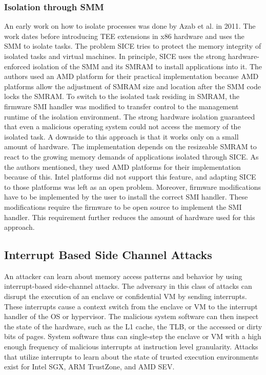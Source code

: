 \subsubsection{Isolation through SMM}
\label{sec:20:isolation_smm}
An early work on how to isolate processes was done by Azab et al. in 2011.\cite{azab_sice_2011}
The work dates before introducing TEE extensions in x86 hardware and uses the SMM to isolate tasks. The problem
SICE tries to protect the memory integrity of isolated tasks and virtual machines.
In principle, SICE uses the strong hardware-enforced
isolation of the SMM and its SMRAM to install applications into it. The authors used an AMD platform for
their practical implementation because AMD platforms allow the adjustment of SMRAM size and location after the SMM code
locks the SMRAM.\cite{bios2014amd} To switch
to the isolated task residing in SMRAM, the firmware SMI handler was modified to transfer control to the
management runtime of the isolation environment. The strong hardware isolation guaranteed that even a malicious
operating system could not access the memory of the isolated task. A downside to this approach is that it works only on
a small amount of hardware. The implementation depends on the resizeable SMRAM to react to the growing
memory demands of applications isolated through SICE. As the authors mentioned, they used AMD platforms for their
implementation because of this. Intel platforms did not support this feature, and adapting SICE to those platforms
was left as an open problem. Moreover, firmware modifications have to be implemented by the user to install the correct
SMI handler. These modifications require the firmware to be open source to implement the SMI handler. This requirement
further reduces the amount of hardware used for this approach.

\subsection{Interrupt Based Side Channel Attacks}
\label{sec:20:interrupt_sca}
An attacker can learn about memory access patterns and behavior by using interrupt-based side-channel attacks. The
adversary in this class of attacks can disrupt the execution of an enclave or confidential VM by sending
interrupts. These interrupts cause a context switch from the enclave or VM to the interrupt handler of the OS or
hypervisor. The malicious system software can then inspect the state of the hardware, such as the L1 cache, the TLB, or
the accessed or dirty bits of pages. System software thus can single-step the enclave or VM with a high enough frequency
of malicious interrupts at instruction level granularity. Attacks that utilize interrupts to learn about the state of
trusted execution environments exist for Intel SGX, ARM TrustZone, and AMD SEV.\cite{van2017sgx, kou2021load, wilke2023sev}

